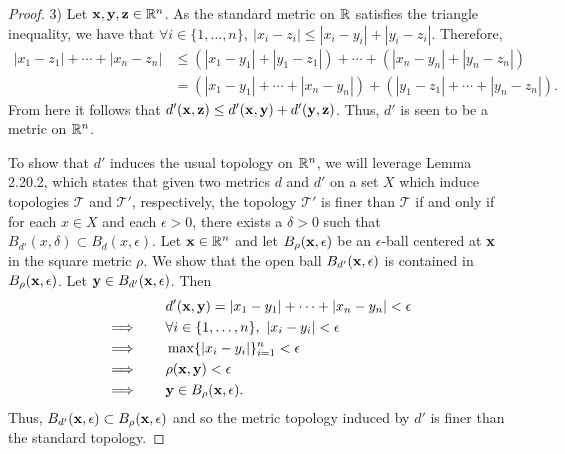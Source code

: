 \begin{solution}
\begin{proof}
        3) Let $\mathbf{x}, \mathbf{y}, \mathbf{z} \in \mathbb{R}^n$.
        As the standard metric on $\mathbb{R}$ satisfies the triangle inequality, we have that $\forall i \in \{1, \ldots, n\},~ |x_i - z_i| \leq |x_i - y_i| + |y_i - z_i|$.
        Therefore,
        \begin{align*}
            |x_1 - z_1| + \cdots + |x_n - z_n|  &\leq \left(|x_1 - y_1| + |y_1 - z_1|\right) + \cdots + \left(|x_n - y_n| + |y_n - z_n|\right) \\
                                                &= \left(|x_1 - y_1| + \cdots + |x_n - y_n|\right) + \left(|y_1 - z_1| + \cdots + |y_n - z_n|\right).
        \end{align*}
        From here it follows that $d'(\mathbf{x}, \mathbf{z}) \leq d'(\mathbf{x}, \mathbf{y}) + d'(\mathbf{y}, \mathbf{z})$.
        Thus, $d'$ is seen to be a metric on $\mathbb{R}^n$.

        To show that $d'$ induces the usual topology on $\mathbb{R}^n$, we will leverage Lemma 2.20.2, which states that given two metrics $d$ and $d'$ on a set $X$ which induce topologies $\mathcal{T}$ and $\mathcal{T}'$, respectively, the topology $\mathcal{T}'$ is finer than $\mathcal{T}$ if and only if for each $x \in X$ and each $\epsilon >0$, there exists a $\delta > 0$ such that $B_{d'}(x, \delta) \subset B_d(x, \epsilon)$.
        Let $\mathbf{x} \in \mathbb{R}^n$ and let $B_\rho(\mathbf{x}, \epsilon)$ be an $\epsilon$-ball centered at $\mathbf{x}$ in the square metric $\rho$.
        We show that the open ball $B_{d'}(\mathbf{x}, \epsilon)$ is contained in $B_\rho(\mathbf{x}, \epsilon)$.
        Let $\mathbf{y} \in B_{d'}(\mathbf{x}, \epsilon)$.
        Then
        \begin{align*}
                            & d'(\mathbf{x}, \mathbf{y}) = |x_1 - y_1| + \cdots + |x_n - y_n|  < \epsilon \\
            \implies\qquad  & \forall i \in \{1, \ldots, n\},~ |x_i - y_i| < \epsilon \\
            \implies\qquad  & \max \{|x_i - y_i|\}_{i=1}^n < \epsilon \\
            \implies\qquad  & \rho(\mathbf{x}, \mathbf{y}) < \epsilon \\
            \implies\qquad  & \mathbf{y} \in B_\rho(\mathbf{x}, \epsilon).
        \end{align*}
        Thus, $B_{d'}(\mathbf{x}, \epsilon) \subset B_\rho(\mathbf{x}, \epsilon)$ and so the metric topology induced by $d'$ is finer than the standard topology.


\end{proof}
\end{solution}
